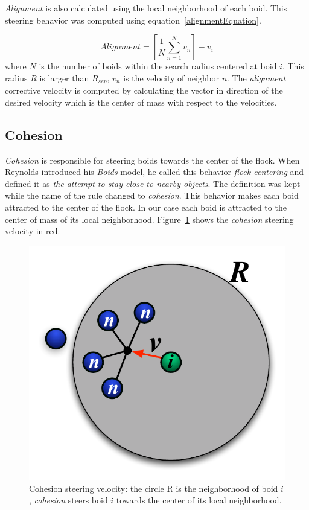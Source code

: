 \textit{Alignment} is also calculated using the local neighborhood of each boid. This steering behavior was computed using equation~\ref{alignmentEquation}.

\begin{equation}
\label{alignmentEquation}
Alignment = \left[  \frac{1}{N} \sum_{n=1}^{N} v_n \right ] - v_i
\end{equation}
where $N$ is the number of boids within the search radius centered at boid $i$. This radius $R$ is larger than $R_{sep}$, $v_n$ is the velocity of neighbor $n$. The \textit{alignment} corrective velocity is computed by calculating the vector in direction of the desired velocity which is the center of mass with respect to the velocities.

\subsection{Cohesion}
\textit{Cohesion} is responsible for steering boids towards the center of the flock. When Reynolds introduced his \textit{Boids} model, he called this behavior \textit{flock centering} and defined it as \textit{the attempt to stay close to nearby objects}. The definition was kept while the name of the rule changed to \textit{cohesion}. This behavior makes each boid attracted to the center of the flock. In our case each boid is attracted to the center of mass of its local neighborhood. Figure~\ref{cohesionPDF} shows the \textit{cohesion} steering velocity in red.

\begin{figure}[htbp]
\begin{center}
\includegraphics[scale=0.85]{figures/cohesion.pdf}
\caption{Cohesion steering velocity: the circle R is the neighborhood of boid $i$, \textit{cohesion} steers boid $i$ towards the center of its local neighborhood.}
\label{cohesionPDF}
\end{center}
\end{figure}

